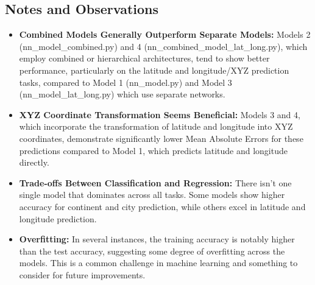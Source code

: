\documentclass{article}
\begin{document}
\subsection*{Notes and Observations}
\begin{itemize}
    \item \textbf{Combined Models Generally Outperform Separate Models:} Models 2 (nn\_model\_combined.py) and 4 (nn\_combined\_model\_lat\_long.py), which employ combined or hierarchical architectures, tend to show better performance, particularly on the latitude and longitude/XYZ prediction tasks, compared to Model 1 (nn\_model.py) and Model 3 (nn\_model\_lat\_long.py) which use separate networks.
    
    \item \textbf{XYZ Coordinate Transformation Seems Beneficial:} Models 3 and 4, which incorporate the transformation of latitude and longitude into XYZ coordinates, demonstrate significantly lower Mean Absolute Errors for these predictions compared to Model 1, which predicts latitude and longitude directly.
    
    \item \textbf{Trade-offs Between Classification and Regression:} There isn't one single model that dominates across all tasks. Some models show higher accuracy for continent and city prediction, while others excel in latitude and longitude prediction.
    
    \item \textbf{Overfitting:} In several instances, the training accuracy is notably higher than the test accuracy, suggesting some degree of overfitting across the models. This is a common challenge in machine learning and something to consider for future improvements.
\end{itemize}
\end{document}
